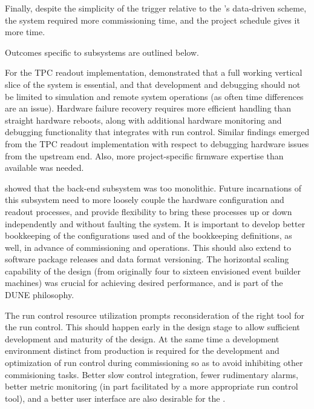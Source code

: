 Finally, %
despite the simplicity of the  trigger 
relative to the 's data-driven  scheme, %
the system required more commissioning time, and  
the  project schedule gives it more time. 

Outcomes specific to  subsystems are outlined below.

For the  TPC readout implementation,  demonstrated that 
a full
working vertical slice of the system is essential, and that
development and debugging should not be limited to simulation and
remote system operations (as often time differences are an
issue). 
Hardware failure recovery requires more efficient handling %
than straight hardware reboots, along with %
additional
hardware monitoring and debugging functionality that integrates with
run control. Similar findings emerged from the   TPC readout implementation
with respect to debugging hardware issues from the  upstream end. %
Also,  %
more project-specific firmware expertise than available was needed.

 showed that the back-end subsystem was %
too monolithic. Future incarnations of
this subsystem need to more loosely couple the hardware configuration
and readout processes, and provide  %
flexibility to bring these processes up or down 
independently and without faulting the system. It is important to develop better bookkeeping of 
the configurations used and of the bookkeeping definitions, %
as well, in advance of %
commissioning and operations. This should also
extend to software package releases and data format versioning. The horizontal
scaling capability of the design (from originally four to sixteen envisioned event
builder machines) was crucial for achieving desired performance, and 
is part of the DUNE  philosophy.

The  run control resource utilization
prompts reconsideration of the right tool for the   run control. This should happen early in
the design stage to allow sufficient development and maturity of the
design. At the same time a development environment %
distinct from production is required for the %
development and optimization of run control during commissioning %
so as to avoid inhibiting other commisioning tasks. Better slow
control integration, %
fewer rudimentary alarms, %
better
metric monitoring (in part facilitated by a more appropriate run
control tool), and a better user interface %
are also %
desirable for the . %

